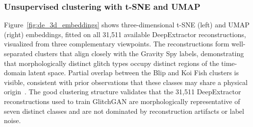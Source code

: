 \documentclass[reprint,nofootinbib,amsmath,amssymb,aps,floatfix]{revtex4-2}
\begin{document}
\subsubsection{Unsupervised clustering with t-SNE and UMAP}

Figure~\ref{fig:de_3d_embeddings} shows three-dimensional t-SNE (left) and UMAP (right) embeddings, fitted on all 31,511 available DeepExtractor reconstructions, visualized from three complementary viewpoints.
The reconstructions form well-separated clusters that align closely with the Gravity Spy labels, demonstrating that morphologically distinct glitch types occupy distinct regions of the time-domain latent space.
Partial overlap between the Blip and Koi Fish clusters is visible, consistent with prior observations that these classes may share a physical origin~\citep{Areeda2017}.
The good clustering structure validates that the 31,511 DeepExtractor reconstructions used to train GlitchGAN are morphologically representative of seven distinct classes and are not dominated by reconstruction artifacts or label noise.
\end{document}
